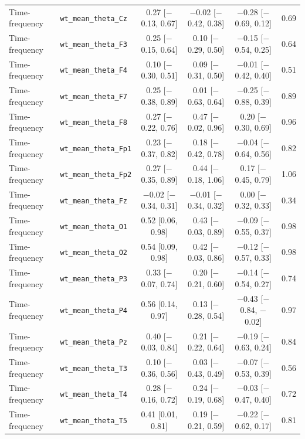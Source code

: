 {\begin{longtable}{llcccc}
Time-frequency & \texttt{wt\_mean\_theta\_Cz} & 0.27 [$-$0.13, 0.67] & $-$0.02 [$-$0.42, 0.38] & $-$0.28 [$-$0.69, 0.12] & 0.69 \\
Time-frequency & \texttt{wt\_mean\_theta\_F3} & 0.25 [$-$0.15, 0.64] & 0.10 [$-$0.29, 0.50] & $-$0.15 [$-$0.54, 0.25] & 0.64 \\
Time-frequency & \texttt{wt\_mean\_theta\_F4} & 0.10 [$-$0.30, 0.51] & 0.09 [$-$0.31, 0.50] & $-$0.01 [$-$0.42, 0.40] & 0.51 \\
Time-frequency & \texttt{wt\_mean\_theta\_F7} & 0.25 [$-$0.38, 0.89] & 0.01 [$-$0.63, 0.64] & $-$0.25 [$-$0.88, 0.39] & 0.89 \\
Time-frequency & \texttt{wt\_mean\_theta\_F8} & 0.27 [$-$0.22, 0.76] & 0.47 [$-$0.02, 0.96] & 0.20 [$-$0.30, 0.69] & 0.96 \\
Time-frequency & \texttt{wt\_mean\_theta\_Fp1} & 0.23 [$-$0.37, 0.82] & 0.18 [$-$0.42, 0.78] & $-$0.04 [$-$0.64, 0.56] & 0.82 \\
Time-frequency & \texttt{wt\_mean\_theta\_Fp2} & 0.27 [$-$0.35, 0.89] & 0.44 [$-$0.18, 1.06] & 0.17 [$-$0.45, 0.79] & 1.06 \\
Time-frequency & \texttt{wt\_mean\_theta\_Fz} & $-$0.02 [$-$0.34, 0.31] & $-$0.01 [$-$0.34, 0.32] & 0.00 [$-$0.32, 0.33] & 0.34 \\
Time-frequency & \texttt{wt\_mean\_theta\_O1} & 0.52 [0.06, 0.98] & 0.43 [$-$0.03, 0.89] & $-$0.09 [$-$0.55, 0.37] & 0.98 \\
Time-frequency & \texttt{wt\_mean\_theta\_O2} & 0.54 [0.09, 0.98] & 0.42 [$-$0.03, 0.86] & $-$0.12 [$-$0.57, 0.33] & 0.98 \\
Time-frequency & \texttt{wt\_mean\_theta\_P3} & 0.33 [$-$0.07, 0.74] & 0.20 [$-$0.21, 0.60] & $-$0.14 [$-$0.54, 0.27] & 0.74 \\
Time-frequency & \texttt{wt\_mean\_theta\_P4} & 0.56 [0.14, 0.97] & 0.13 [$-$0.28, 0.54] & $-$0.43 [$-$0.84, $-$0.02] & 0.97 \\
Time-frequency & \texttt{wt\_mean\_theta\_Pz} & 0.40 [$-$0.03, 0.84] & 0.21 [$-$0.22, 0.64] & $-$0.19 [$-$0.63, 0.24] & 0.84 \\
Time-frequency & \texttt{wt\_mean\_theta\_T3} & 0.10 [$-$0.36, 0.56] & 0.03 [$-$0.43, 0.49] & $-$0.07 [$-$0.53, 0.39] & 0.56 \\
Time-frequency & \texttt{wt\_mean\_theta\_T4} & 0.28 [$-$0.16, 0.72] & 0.24 [$-$0.19, 0.68] & $-$0.03 [$-$0.47, 0.40] & 0.72 \\
Time-frequency & \texttt{wt\_mean\_theta\_T5} & 0.41 [0.01, 0.81] & 0.19 [$-$0.21, 0.59] & $-$0.22 [$-$0.62, 0.17] & 0.81 \\

\end{longtable}}
